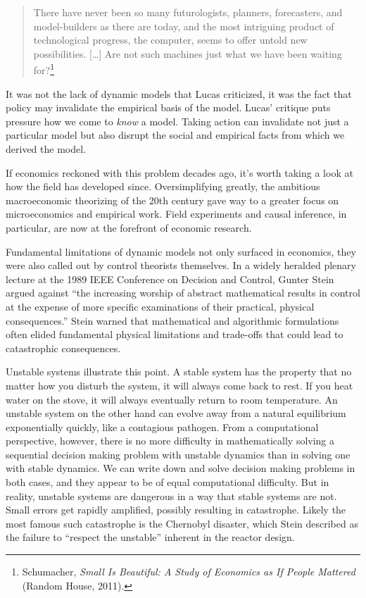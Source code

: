 \documentclass{tufte-book}
\begin{document}
\begin{quote}
There have never been so many futurologists, planners, forecasters, and
model-builders as there are today, and the most intriguing product of
technological progress, the computer, seems to offer untold new
possibilities. {[}\ldots{]} Are not such machines just what we have been
waiting for?\footnote{Schumacher, \emph{Small Is Beautiful: A Study of
  Economics as If People Mattered} (Random House, 2011).}
\end{quote}

It was not the lack of dynamic models that Lucas criticized, it was the
fact that policy may invalidate the empirical basis of the model. Lucas'
critique puts pressure how we come to \emph{know} a model. Taking action
can invalidate not just a particular model but also disrupt the social
and empirical facts from which we derived the model.

If economics reckoned with this problem decades ago, it's worth taking a
look at how the field has developed since. Oversimplifying greatly, the
ambitious macroeconomic theorizing of the 20th century gave way to a
greater focus on microeconomics and empirical work. Field experiments
and causal inference, in particular, are now at the forefront of
economic research.

Fundamental limitations of dynamic models not only surfaced in
economics, they were also called out by control theorists themselves. In
a widely heralded plenary lecture at the 1989 IEEE Conference on
Decision and Control, Gunter Stein argued against ``the increasing
worship of abstract mathematical results in control at the expense of
more specific examinations of their practical, physical consequences.''
Stein warned that mathematical and algorithmic formulations often elided
fundamental physical limitations and trade-offs that could lead to
catastrophic consequences.

Unstable systems illustrate this point. A stable system has the property
that no matter how you disturb the system, it will always come back to
rest. If you heat water on the stove, it will always eventually return
to room temperature. An unstable system on the other hand can evolve
away from a natural equilibrium exponentially quickly, like a contagious
pathogen. From a computational perspective, however, there is no more
difficulty in mathematically solving a sequential decision making
problem with unstable dynamics than in solving one with stable dynamics.
We can write down and solve decision making problems in both cases, and
they appear to be of equal computational difficulty. But in reality,
unstable systems are dangerous in a way that stable systems are not.
Small errors get rapidly amplified, possibly resulting in catastrophe.
Likely the most famous such catastrophe is the Chernobyl disaster, which
Stein described as the failure to ``respect the unstable'' inherent in
the reactor design.
\end{document}
